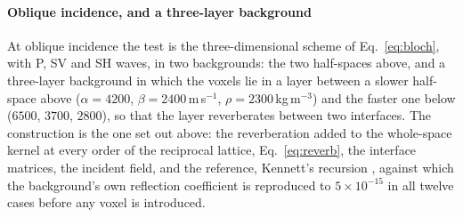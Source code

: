 \documentclass[preprint,review,12pt]{elsarticle}
\begin{document}
\FloatBarrier

\paragraph{Oblique incidence, and a three-layer background} At oblique incidence the test is the
three-dimensional scheme of Eq.~\eqref{eq:bloch}, with P, SV and SH waves, in two backgrounds: the two
half-spaces above, and a three-layer background in which the voxels lie in a layer between a slower
half-space above ($\alpha=4200$, $\beta=2400$\,m\,s$^{-1}$, $\rho=2300$\,kg\,m$^{-3}$) and the faster
one below ($6500$, $3700$, $2800$), so that the layer reverberates between two interfaces. The construction is the one set out above: the reverberation added to the whole-space kernel
at every order of the reciprocal lattice, Eq.~\eqref{eq:reverb}, the interface matrices, the
incident field, and the reference, Kennett's recursion \citep{Kennett1983}, against which the
background's own reflection coefficient is reproduced to $5\times10^{-15}$ in all twelve cases before
any voxel is introduced.
\end{document}

